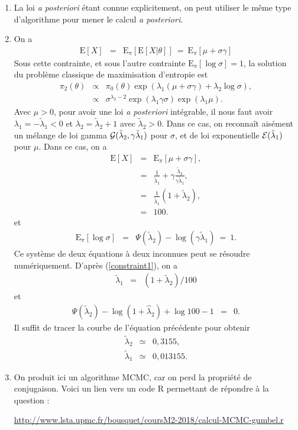 \documentclass[10pt]{article}
\newcommand{\E}{\mbox{E}}
\newcommand{\1}{\mathbbm{1}}
\begin{document}
\begin{enumerate}
\item La loi {\it a posteriori} étant connue explicitement, on peut utiliser le même type d'algorithme pour mener le calcul {\it a posteriori}. 
\item On a 
\begin{eqnarray*}
\E[X] & = & \E_{\pi}[\E[X|\theta]] \ = \ \E_{\pi}[\mu+\sigma\gamma]
\end{eqnarray*}
Sous cette contrainte, et sous l'autre contrainte $\E_{\pi}[\log \sigma]  =  1$, la solution du problème classique de maximisation d'entropie est
\begin{eqnarray*}
\pi_2(\theta) & \propto & \pi_0(\theta) \exp(\lambda_1(\mu + \sigma\gamma) + \lambda_2 \log \sigma), \\
& \propto & \sigma^{\lambda_2-2} \exp(\lambda_1 \gamma \sigma) \exp(\lambda_1\mu).
\end{eqnarray*}
Avec $\mu>0$, pour avoir une loi {\it a posteriori} intégrable, il nous faut avoir $\lambda_1=-\tilde{\lambda}_1<0$ et $\lambda_2=\tilde{\lambda}_2 + 1$ avec $\tilde{\lambda}_2>0$. Dans ce cas, on reconnaît aisément un mélange de loi gamma ${\cal{G}}(\tilde{\lambda}_2,\gamma\tilde{\lambda}_1)$ pour $\sigma$, et de loi exponentielle ${\cal{E}}(\tilde{\lambda}_1)$ pour $\mu$. Dans ce cas, on a 
\begin{eqnarray}
\E[X] & = & \E_{\pi}[\mu+\sigma\gamma], \nonumber \\
         & =  & \frac{1}{\tilde{\lambda}_1} + \gamma\frac{\tilde{\lambda}_2}{\gamma\tilde{\lambda}_1}, \nonumber \\
         & = &  \frac{1}{\tilde{\lambda}_1}(1 + \tilde{\lambda}_2),\nonumber \\
         & = & 100. \label{constraint1}
\end{eqnarray}
et 
\begin{eqnarray*}
\E_{\pi}[\log \sigma] & = & \Psi(\tilde{\lambda}_2)-\log(\gamma\tilde{\lambda}_1) \ = \ 1.
\end{eqnarray*}
Ce système de deux équations à deux inconnues peut se résoudre numériquement. D'après (\ref{constraint1}), on a
\begin{eqnarray*}
\tilde{\lambda}_1 & = & (1 + \tilde{\lambda}_2)/100
\end{eqnarray*}
et
\begin{eqnarray*}
\Psi(\tilde{\lambda}_2) -  \log(1 + \hat{\lambda}_2) + \log 100 - 1 & = & 0.
\end{eqnarray*}
Il suffit de tracer la courbe de l'équation précédente pour obtenir 
\begin{eqnarray*}
\tilde{\lambda}_2 & \simeq & 0,3155, \\
\tilde{\lambda}_1 & \simeq & 0,013155.
\end{eqnarray*}
\item On produit ici un algorithme MCMC, car on perd la propriété de conjugaison. Voici un lien vers un code R permettant de répondre à la question : \\
\begin{center}
\url{http://www.lsta.upmc.fr/bousquet/coursM2-2018/calcul-MCMC-gumbel.r}
\end{center}

\end{enumerate}
\end{document}
